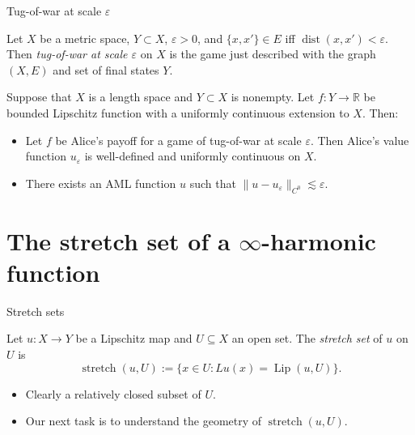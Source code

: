 \documentclass[10pt]{beamer}
\newcommand{\RR}{\mathbb{R}}
\DeclareMathOperator{\dist}{dist}
\DeclareMathOperator{\Lip}{Lip}
\DeclareMathOperator{\Stretch}{stretch}
\begin{document}
\begin{frame}{Tug-of-war at scale $\varepsilon$}
\begin{definition}
Let $X$ be a metric space, $Y \subset X$, $\varepsilon > 0$, and $\{x, x'\} \in E$ iff $\dist(x, x') < \varepsilon$.
Then \emph{tug-of-war at scale $\varepsilon$} on $X$ is the game just described with the graph $(X, E)$ and set of final states $Y$. \pause
\end{definition} 

\begin{theorem}
Suppose that $X$ is a length space and $Y \subset X$ is nonempty.
Let $f: Y \to \RR$ be bounded Lipschitz function with a uniformly continuous extension to $X$.
Then: \pause
\begin{itemize}
\item Let $f$ be Alice's payoff for a game of tug-of-war at scale $\varepsilon$.
Then Alice's value function $u_\varepsilon$ is well-defined and uniformly continuous on $X$. \pause
\item There exists an AML function $u$ such that $\|u - u_\varepsilon\|_{C^0} \lesssim \varepsilon$. 
\end{itemize}
\end{theorem}
\end{frame}

\section{The stretch set of a \texorpdfstring{$\infty$-harmonic}{infinity-harmonic} function}

\begin{frame}{Stretch sets}
\begin{definition}[Thurston '86]
Let $u: X \to Y$ be a Lipschitz map and $U \subseteq X$ an open set. The \emph{stretch set} of $u$ on $U$ is 
$$\Stretch(u, U) := \{x \in U: Lu(x) = \Lip(u, U)\}.$$
\end{definition}

\begin{itemize}
\item Clearly a relatively closed subset of $U$.
\item Our next task is to understand the geometry of $\Stretch(u, U)$.
\end{itemize}
    
\end{frame}
\end{document}
